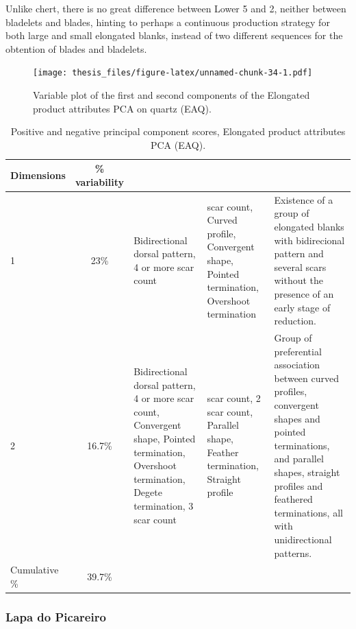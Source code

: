 \documentclass[12pt,twoside]{reedthesis}
\begin{document}
Unlike chert, there is no great difference between Lower 5 and 2, neither between bladelets and blades, hinting to perhaps a continuous production strategy for both large and small elongated blanks, instead of two different sequences for the obtention of blades and bladelets.
\begin{figure}
\centering
\texttt{[image: thesis\_files/figure-latex/unnamed-chunk-34-1.pdf]}
\caption{\label{fig:unnamed-chunk-34}Variable plot of the first and second components of the Elongated product attributes PCA on quartz (EAQ).}
\end{figure}
\begin{table}[!h]

\caption{\label{tab:unnamed-chunk-35}Positive and negative principal component scores, Elongated product attributes PCA (EAQ).}
\centering
\begin{tabular}[t]{lc>{\raggedright\arraybackslash}p{3cm}>{\raggedright\arraybackslash}p{3cm}>{\raggedright\arraybackslash}p{3cm}}
\toprule
\multicolumn{1}{c}{\textbf{Dimensions}} & \multicolumn{1}{c}{\textbf{\% variability}} & \multicolumn{1}{>{\centering\arraybackslash}p{3cm}}{\textbf{+}} & \multicolumn{1}{>{\centering\arraybackslash}p{3cm}}{\textbf{-}} & \multicolumn{1}{>{\centering\arraybackslash}p{3cm}}{\textbf{Interpretation}}\\
\midrule
1 & 23\% & Bidirectional dorsal pattern, 4 or more scar count & 3 scar count, Curved profile, Convergent shape, Pointed termination, Overshoot termination & Existence of a group of elongated blanks with bidirecional pattern and several scars
                               without the presence of an early stage of reduction.\\
2 & 16.7\% & Bidirectional dorsal pattern, 4 or more scar count, Convergent shape, Pointed termination, Overshoot termination,
                               Degete termination, 3 scar count & 1 scar count, 2 scar count, Parallel shape, Feather termination, Straight profile & Group of preferential association between curved profiles, convergent shapes and pointed terminations, and parallel shapes, straight profiles and feathered terminations, all with unidirectional patterns.\\
Cumulative \% & 39.7\% &  &  & \\
\bottomrule
\end{tabular}
\end{table}
\hypertarget{lapa-do-picareiro-8}{%
\subsubsection{Lapa do Picareiro}\label{lapa-do-picareiro-8}}
\end{document}
